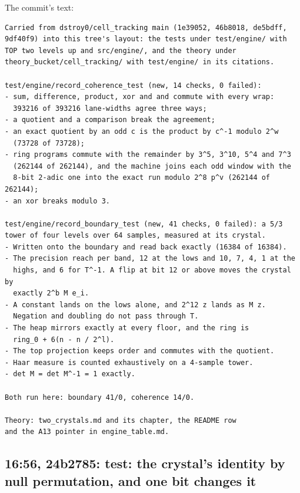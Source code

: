 The commit's text:

\begin{Verbatim}
Carried from dstroy0/cell_tracking main (1e39052, 46b8018, de5bdff,
9df40f9) into this tree's layout: the tests under test/engine/ with
TOP two levels up and src/engine/, and the theory under
theory_bucket/cell_tracking/ with test/engine/ in its citations.

test/engine/record_coherence_test (new, 14 checks, 0 failed):
- sum, difference, product, xor and and commute with every wrap:
  393216 of 393216 lane-widths agree three ways;
- a quotient and a comparison break the agreement;
- an exact quotient by an odd c is the product by c^-1 modulo 2^w
  (73728 of 73728);
- ring programs commute with the remainder by 3^5, 3^10, 5^4 and 7^3
  (262144 of 262144), and the machine joins each odd window with the
  8-bit 2-adic one into the exact run modulo 2^8 p^v (262144 of 262144);
- an xor breaks modulo 3.

test/engine/record_boundary_test (new, 41 checks, 0 failed): a 5/3
tower of four levels over 64 samples, measured at its crystal.
- Written onto the boundary and read back exactly (16384 of 16384).
- The precision reach per band, 12 at the lows and 10, 7, 4, 1 at the
  highs, and 6 for T^-1. A flip at bit 12 or above moves the crystal by
  exactly 2^b M e_i.
- A constant lands on the lows alone, and 2^12 z lands as M z.
  Negation and doubling do not pass through T.
- The heap mirrors exactly at every floor, and the ring is
  ring_0 + 6(n - n / 2^l).
- The top projection keeps order and commutes with the quotient.
- Haar measure is counted exhaustively on a 4-sample tower.
- det M = det M^-1 = 1 exactly.

Both run here: boundary 41/0, coherence 14/0.

Theory: two_crystals.md and its chapter, the README row
and the A13 pointer in engine_table.md.
\end{Verbatim}

\subsection{\texorpdfstring{16:56, 24b2785: test: the crystal's identity by null permutation, and one bit changes it}{16:56, 24b2785: test: the crystal's identity by null permutation, and one bit changes it}}

